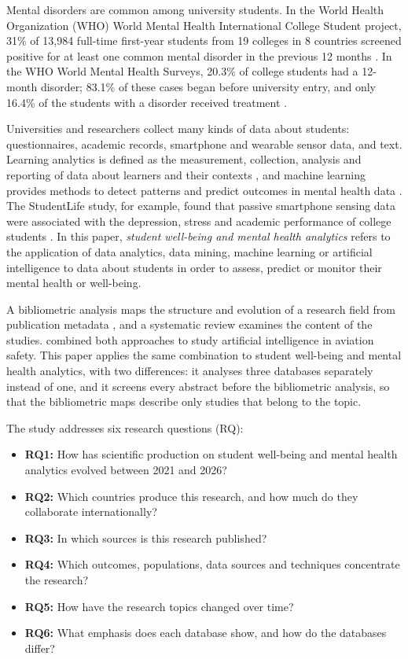 \documentclass[11pt,a4paper]{article}
\begin{document}
Mental disorders are common among university students. In the World Health Organization (WHO) World Mental Health International College Student project, 31\% of 13{,}984 full-time first-year students from 19 colleges in 8 countries screened positive for at least one common mental disorder in the previous 12 months \cite{auerbach2018wmhicsp}. In the WHO World Mental Health Surveys, 20.3\% of college students had a 12-month disorder; 83.1\% of these cases began before university entry, and only 16.4\% of the students with a disorder received treatment \cite{auerbach2016college}.

Universities and researchers collect many kinds of data about students: questionnaires, academic records, smartphone and wearable sensor data, and text. Learning analytics is defined as the measurement, collection, analysis and reporting of data about learners and their contexts \cite{siemens2011analytics}, and machine learning provides methods to detect patterns and predict outcomes in mental health data \cite{shatte2019mlmh}. The StudentLife study, for example, found that passive smartphone sensing data were associated with the depression, stress and academic performance of college students \cite{wang2014studentlife}. In this paper, \emph{student well-being and mental health analytics} refers to the application of data analytics, data mining, machine learning or artificial intelligence to data about students in order to assess, predict or monitor their mental health or well-being.

A bibliometric analysis maps the structure and evolution of a research field from publication metadata \cite{donthu2021bibliometric,zupic2015bibliometric}, and a systematic review examines the content of the studies. \citet{demir2024aviation} combined both approaches to study artificial intelligence in aviation safety. This paper applies the same combination to student well-being and mental health analytics, with two differences: it analyses three databases separately instead of one, and it screens every abstract before the bibliometric analysis, so that the bibliometric maps describe only studies that belong to the topic.

The study addresses six research questions (RQ):

\begin{itemize}
  \item \textbf{RQ1:} How has scientific production on student well-being and mental health analytics evolved between 2021 and 2026?
  \item \textbf{RQ2:} Which countries produce this research, and how much do they collaborate internationally?
  \item \textbf{RQ3:} In which sources is this research published?
  \item \textbf{RQ4:} Which outcomes, populations, data sources and techniques concentrate the research?
  \item \textbf{RQ5:} How have the research topics changed over time?
  \item \textbf{RQ6:} What emphasis does each database show, and how do the databases differ?
\end{itemize}
\end{document}
